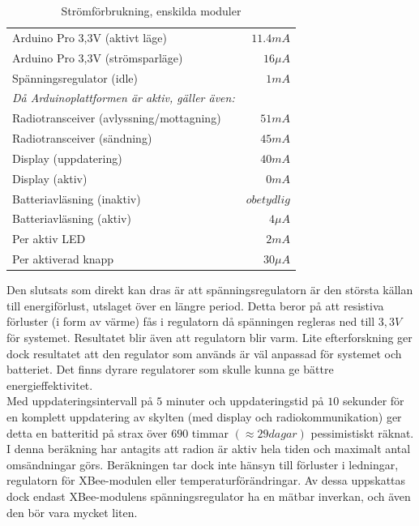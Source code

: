 \documentclass[a4paper,11pt]{article}
\begin{document}
\begin{table}[h]
\centering
	\begin{tabular}{|l|r|}
	Arduino Pro 3,3V (aktivt läge) & {$11.4 mA$}\\
	Arduino Pro 3,3V (strömsparläge) & {$16 {\mu}A$}\\
	Spänningsregulator (idle) & {$1 mA$}\\
	{\it Då Arduinoplattformen är aktiv, gäller även:} & { }\\	
	Radiotransceiver (avlyssning/mottagning) & {$51 mA$}\\
	Radiotransceiver (sändning) & {$45 mA$}\\
	Display (uppdatering) & {$40 mA$}\\
	Display (aktiv) &  {$0 mA$}\\
	Batteriavläsning (inaktiv) & {$obetydlig$}\\
	Batteriavläsning (aktiv) & {$4 {\mu}A$}\\
	Per aktiv LED & {$2 mA$}\\
	Per aktiverad knapp & {$30 {\mu}A$}\\
	\end{tabular}
\caption{Strömförbrukning, enskilda moduler}
\label{tab:currentdrawtable}
\end{table}

Den slutsats som direkt kan dras är att spänningsregulatorn är den största källan till energiförlust, utslaget över en längre period. Detta beror på att resistiva förluster (i form av värme) fås i regulatorn då spänningen regleras ned till $3,3V$ för systemet. Resultatet blir även att regulatorn blir varm. Lite efterforskning ger dock resultatet att den regulator som används är väl anpassad för systemet och batteriet. Det finns dyrare regulatorer som skulle kunna ge bättre energieffektivitet. \\

Med uppdateringsintervall på $5$ minuter och uppdateringstid på $10$ sekunder för en komplett uppdatering av skylten (med display och radiokommunikation) ger detta en batteritid på strax över $690$ timmar $(\approx 29 dagar)$ pessimistiskt räknat. I denna beräkning har antagits att radion är aktiv hela tiden och maximalt antal omsändningar görs. Beräkningen tar dock inte hänsyn till förluster i ledningar, regulatorn för XBee-modulen eller temperaturförändringar. Av dessa uppskattas dock endast XBee-modulens spänningsregulator ha en mätbar inverkan, och även den bör vara mycket liten. \\
\end{document}
